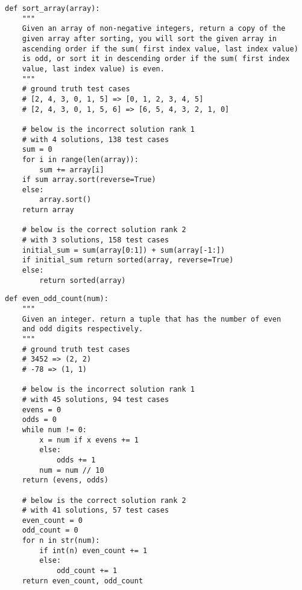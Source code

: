\iffalse
\begin{lstlisting}[style=mypython,caption={Ambiguous Problem Description}, label={lst:code1}, basicstyle=\tiny]
def sort_array(array):
    """
    Given an array of non-negative integers, return a copy of the 
    given array after sorting, you will sort the given array in 
    ascending order if the sum( first index value, last index value) 
    is odd, or sort it in descending order if the sum( first index 
    value, last index value) is even.
    """
    # ground truth test cases
    # [2, 4, 3, 0, 1, 5] => [0, 1, 2, 3, 4, 5]
    # [2, 4, 3, 0, 1, 5, 6] => [6, 5, 4, 3, 2, 1, 0]
    
    # below is the incorrect solution rank 1
    # with 4 solutions, 138 test cases
    sum = 0
    for i in range(len(array)):
        sum += array[i]
    if sum array.sort(reverse=True)
    else:
        array.sort()
    return array
    
    # below is the correct solution rank 2
    # with 3 solutions, 158 test cases
    initial_sum = sum(array[0:1]) + sum(array[-1:])
    if initial_sum return sorted(array, reverse=True)
    else:
        return sorted(array)
\end{lstlisting}


\begin{lstlisting}[style=mypython,caption={Failing Corner Cases}, label={lst:code2}, basicstyle=\tiny]
def even_odd_count(num):
    """
    Given an integer. return a tuple that has the number of even
    and odd digits respectively.
    """
    # ground truth test cases
    # 3452 => (2, 2)
    # -78 => (1, 1)
    
    # below is the incorrect solution rank 1
    # with 45 solutions, 94 test cases
    evens = 0
    odds = 0
    while num != 0:
        x = num if x evens += 1
        else:
            odds += 1
        num = num // 10
    return (evens, odds)
    
    # below is the correct solution rank 2
    # with 41 solutions, 57 test cases
    even_count = 0
    odd_count = 0
    for n in str(num):
        if int(n) even_count += 1
        else:
            odd_count += 1
    return even_count, odd_count
\end{lstlisting}



